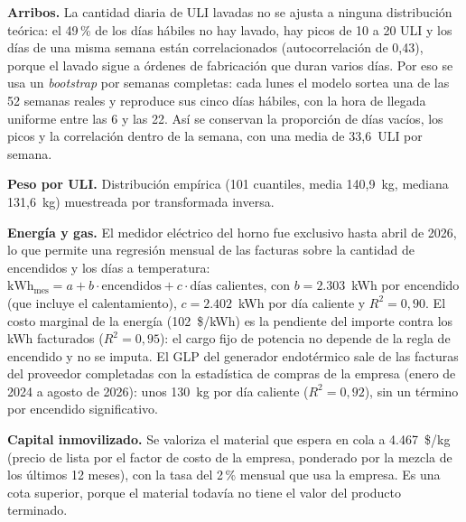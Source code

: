\documentclass[a4paper,11pt]{article}
\begin{document}
\textbf{Arribos.} La cantidad diaria de ULI lavadas no se ajusta a ninguna distribución teórica: el 49\,\% de
los días hábiles no hay lavado, hay picos de 10 a 20 ULI y los días de una misma semana están correlacionados
(autocorrelación de 0,43), porque el lavado sigue a órdenes de fabricación que duran varios días. Por eso se
usa un \emph{bootstrap} por semanas completas: cada lunes el modelo sortea una de las 52 semanas reales y
reproduce sus cinco días hábiles, con la hora de llegada uniforme entre las 6 y las 22. Así se conservan la
proporción de días vacíos, los picos y la correlación dentro de la semana, con una media de 33,6~ULI por semana.

\textbf{Peso por ULI.} Distribución empírica (101 cuantiles, media 140,9~kg, mediana 131,6~kg) muestreada por
transformada inversa.

\textbf{Energía y gas.} El medidor eléctrico del horno fue exclusivo hasta abril de 2026, lo que permite una
regresión mensual de las facturas sobre la cantidad de encendidos y los días a temperatura:
$\text{kWh}_{\text{mes}} = a + b \cdot \text{encendidos} + c \cdot \text{días calientes}$, con
$b = 2.303$~kWh por encendido (que incluye el calentamiento), $c = 2.402$~kWh por día caliente y $R^2 = 0{,}90$.
El costo marginal de la energía (102~\$/kWh) es la pendiente del importe contra los kWh facturados ($R^2 =
0{,}95$): el cargo fijo de potencia no depende de la regla de encendido y no se imputa. El GLP del generador
endotérmico sale de las facturas del proveedor completadas con la estadística de compras de la empresa
(enero de 2024 a agosto de 2026): unos 130~kg por día caliente ($R^2 = 0{,}92$), sin un término por encendido
significativo.

\textbf{Capital inmovilizado.} Se valoriza el material que espera en cola a 4.467~\$/kg (precio de lista por
el factor de costo de la empresa, ponderado por la mezcla de los últimos 12 meses), con la tasa del 2\,\%
mensual que usa la empresa. Es una cota superior, porque el material todavía no tiene el valor del producto
terminado.
\end{document}
